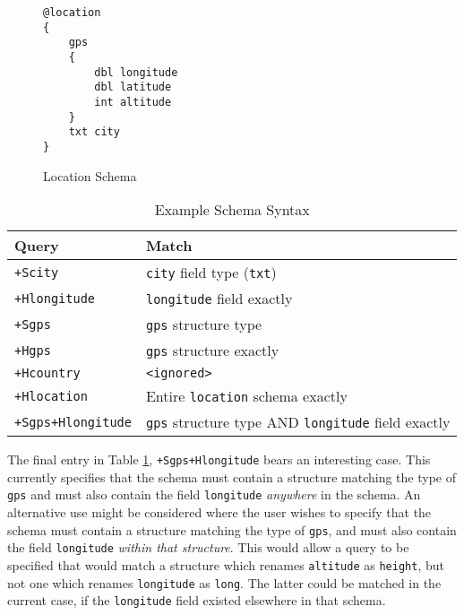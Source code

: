\documentclass[12pt,twoside,notitlepage]{report}
\begin{document}
\begin{figure}[tbh]
\begin{lstlisting}
@location
{
	gps
	{
		dbl longitude
		dbl latitude
		int altitude
	}
	txt city
}
\end{lstlisting}
\caption{Location Schema}
\label{fig:locationschema}
\end{figure}

\begin{table}[tbh]
\centering

\begin{tabular}{l l}
\hline\hline
Query & Match \\
\hline

{\tt +Scity}		& {\tt city} field type ({\tt txt}) \\
{\tt +Hlongitude}	& {\tt longitude} field exactly \\

{\tt +Sgps}			& {\tt gps} structure type \\
{\tt +Hgps}			& {\tt gps} structure exactly \\

{\tt +Hcountry}		& {\tt <ignored>} \\
{\tt +Hlocation}	& Entire {\tt location} schema exactly \\

{\tt +Sgps+Hlongitude}	& {\tt gps} structure type AND {\tt longitude} field exactly \\

\hline
\end{tabular}

\caption{Example Schema Syntax}
\label{tab:example_schema_syntax}
\end{table}

The final entry in Table \ref{tab:example_schema_syntax}, {\tt +Sgps+Hlongitude} bears an interesting case. 
This currently specifies that the schema must contain a structure matching the type of {\tt gps} and must also contain the field {\tt longitude} {\sl anywhere} in the schema. 
An alternative use might be considered where the user wishes to specify that the schema must contain a structure matching the type of {\tt gps}, and must also contain the field {\tt longitude} {\sl within that structure}. 
This would allow a query to be specified that would match a structure which renames {\tt altitude} as {\tt height}, but not one which renames {\tt longitude} as {\tt long}. 
The latter could be matched in the current case, if the {\tt longitude} field existed elsewhere in that schema. 
\end{document}
